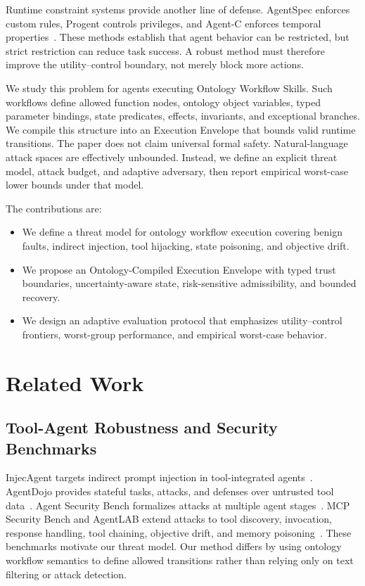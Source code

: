 \documentclass[10pt,twocolumn]{article}
\begin{document}
Runtime constraint systems provide another line of defense. AgentSpec enforces custom rules, Progent controls privileges, and Agent-C enforces temporal properties~\cite{wang2025agentspec,shi2025progent,kamath2025agentc}. These methods establish that agent behavior can be restricted, but strict restriction can reduce task success. A robust method must therefore improve the utility--control boundary, not merely block more actions.

We study this problem for agents executing Ontology Workflow Skills. Such workflows define allowed function nodes, ontology object variables, typed parameter bindings, state predicates, effects, invariants, and exceptional branches. We compile this structure into an Execution Envelope that bounds valid runtime transitions. The paper does not claim universal formal safety. Natural-language attack spaces are effectively unbounded. Instead, we define an explicit threat model, attack budget, and adaptive adversary, then report empirical worst-case lower bounds under that model.

The contributions are:
\begin{itemize}
    \item We define a threat model for ontology workflow execution covering benign faults, indirect injection, tool hijacking, state poisoning, and objective drift.
    \item We propose an Ontology-Compiled Execution Envelope with typed trust boundaries, uncertainty-aware state, risk-sensitive admissibility, and bounded recovery.
    \item We design an adaptive evaluation protocol that emphasizes utility--control frontiers, worst-group performance, and empirical worst-case behavior.
\end{itemize}

\section{Related Work}
\subsection{Tool-Agent Robustness and Security Benchmarks}
InjecAgent targets indirect prompt injection in tool-integrated agents~\cite{zhan2024injecagent}. AgentDojo provides stateful tasks, attacks, and defenses over untrusted tool data~\cite{debenedetti2024agentdojo}. Agent Security Bench formalizes attacks at multiple agent stages~\cite{zhang2024asb}. MCP Security Bench and AgentLAB extend attacks to tool discovery, invocation, response handling, tool chaining, objective drift, and memory poisoning~\cite{zhang2025mcpsecurity,jiang2026agentlab}. These benchmarks motivate our threat model. Our method differs by using ontology workflow semantics to define allowed transitions rather than relying only on text filtering or attack detection.
\end{document}
